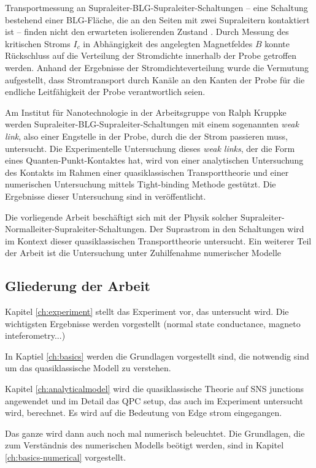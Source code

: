 Transportmessung an Supraleiter-BLG-Supraleiter-Schaltungen -- eine Schaltung bestehend einer BLG-Fl\"ache, die an den Seiten mit zwei Supraleitern kontaktiert ist -- finden nicht den erwarteten isolierenden Zustand \cite{Zhu2017}. Durch Messung des kritischen Stroms $I_c$ in Abh\"angigkeit des angelegten Magnetfeldes $B$ konnte R\"uckschluss auf die Verteilung der Stromdichte innerhalb der Probe getroffen werden. Anhand der Ergebnisse der Stromdichteverteilung wurde die Vermutung aufgestellt, dass Stromtransport durch Kan\"ale an den Kanten der Probe f\"ur die endliche Leitf\"ahigkeit der Probe verantwortlich seien. 

Am Institut f\"ur Nanotechnologie in der Arbeitsgruppe von Ralph Kruppke werden Supraleiter-BLG-Supraleiter-Schaltungen mit einem sogenannten \emph{weak link}, also einer Engstelle in der Probe, durch die der Strom passieren muss, untersucht. Die Experimentelle Untersuchung dieses \emph{weak links}, der die Form eines Quanten-Punkt-Kontaktes hat, wird von einer analytischen Untersuchung des Kontakts im Rahmen einer quasiklassischen Transporttheorie und einer numerischen Untersuchung mittels Tight-binding Methode gest\"utzt. Die Ergebnisse dieser Untersuchung sind in \cite{Kraft2017} ver\"offentlicht. 

Die vorliegende Arbeit besch\"aftigt sich mit der Physik solcher Supraleiter-Normalleiter-Supraleiter-Schaltungen. Der Suprastrom in den Schaltungen wird im Kontext dieser quasiklassischen Transporttheorie untersucht. Ein weiterer Teil der Arbeit ist die Untersuchung unter Zuhilfenahme numerischer Modelle




\subsection*{Gliederung der Arbeit} 
Kapitel \ref{ch:experiment} stellt das Experiment vor, das untersucht wird. Die wichtigsten Ergebnisse werden vorgestellt (normal state conductance, magneto inteferometry...)

In Kaptiel \ref{ch:basics} werden die Grundlagen vorgestellt sind, die notwendig  sind um das quasiklassische Modell zu verstehen.

Kapitel \ref{ch:analyticalmodel} wird die quasiklassische Theorie auf SNS junctions angewendet und im Detail das QPC setup, das auch im Experiment untersucht wird, berechnet. Es wird auf die Bedeutung von Edge strom eingegangen.

Das ganze wird dann auch noch mal numerisch beleuchtet. Die Grundlagen, die zum Verst\"andnis des numerischen Modells be\"otigt werden, sind in Kapitel \ref{ch:basics-numerical} vorgestellt.


